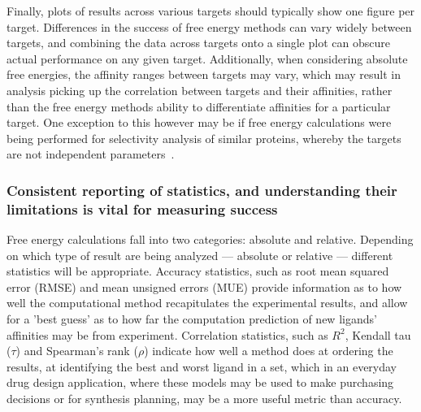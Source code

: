 \documentclass[9pt,bestpractices]{livecoms}
\begin{document}
Finally, plots of results across various targets should typically show one figure per target. Differences in the success of free energy methods can vary widely between targets, and combining the data across targets onto a single plot can obscure actual performance on any given target. Additionally, when considering absolute free energies, the affinity ranges between targets may vary, which may result in analysis picking up the correlation between targets and their affinities, rather than the free energy methods ability to differentiate affinities for a particular target. One exception to this however may be if free energy calculations were being performed for selectivity analysis of similar proteins, whereby the targets are not independent parameters~\cite{aldeghiPredictionsLigandSelectivity2017}.

\subsubsection{Consistent reporting of statistics, and understanding their limitations is vital for measuring success}
\label{sec:statistical_analysis}
Free energy calculations fall into two categories: absolute and relative. Depending on which type of result are being analyzed --- absolute or relative --- different statistics will be appropriate. Accuracy statistics, such as root mean squared error (RMSE) and mean unsigned errors (MUE) provide information as to how well the computational method recapitulates the experimental results, and allow for a 'best guess' as to how far the computation prediction of new ligands' affinities may be from experiment. Correlation statistics, such as $R^{2}$, Kendall tau ($\tau$) and Spearman's rank ($\rho$) indicate how well a method does at ordering the results, at identifying the best and worst ligand in a set, which in an everyday drug design application, where these models may be used to make purchasing decisions or for synthesis planning, may be a more useful metric than accuracy.
\end{document}
